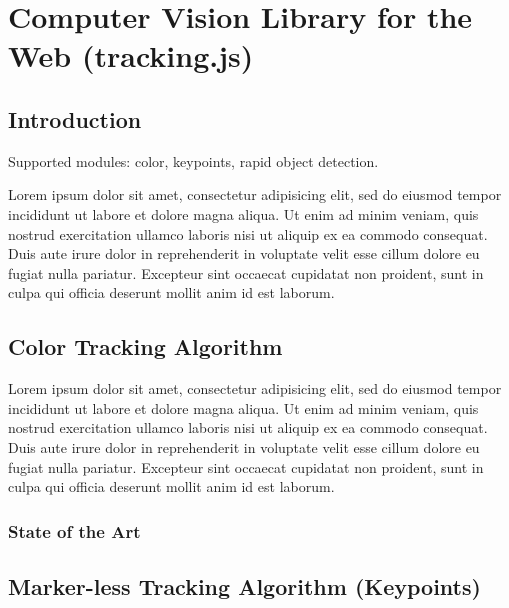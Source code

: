 \chapter{Computer Vision Library for the Web (tracking.js)} %
\label{cha:computer_vision_library_for_the_web}

\section{Introduction} %
\label{sec:computer_vision_library_for_the_web:introduction}

Supported modules: color, keypoints, rapid object detection.

Lorem ipsum dolor sit amet, consectetur adipisicing elit, sed do eiusmod
tempor incididunt ut labore et dolore magna aliqua. Ut enim ad minim veniam,
quis nostrud exercitation ullamco laboris nisi ut aliquip ex ea commodo
consequat. Duis aute irure dolor in reprehenderit in voluptate velit esse
cillum dolore eu fugiat nulla pariatur. Excepteur sint occaecat cupidatat non
proident, sunt in culpa qui officia deserunt mollit anim id est laborum.


\section{Color Tracking Algorithm} %
\label{sec:computer_vision_library_for_the_web:color_tracking_algorithm}

Lorem ipsum dolor sit amet, consectetur adipisicing elit, sed do eiusmod
tempor incididunt ut labore et dolore magna aliqua. Ut enim ad minim veniam,
quis nostrud exercitation ullamco laboris nisi ut aliquip ex ea commodo
consequat. Duis aute irure dolor in reprehenderit in voluptate velit esse
cillum dolore eu fugiat nulla pariatur. Excepteur sint occaecat cupidatat non
proident, sunt in culpa qui officia deserunt mollit anim id est laborum.

\subsection{State of the Art} %
\label{sub:computer_vision_library_for_the_web:color_tracking_algorithm:state_of_the_art}



\section{Marker-less Tracking Algorithm (Keypoints)} %
\label{sec:computer_vision_library_for_the_web:marker_less_tracking_algorithm}

